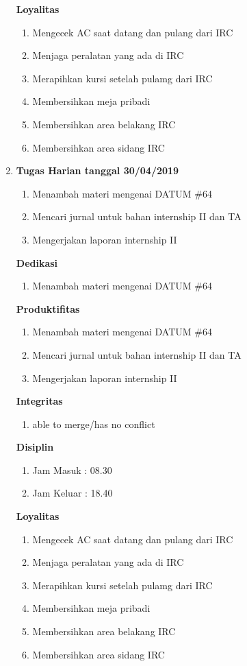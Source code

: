 \begin{enumerate}
\textbf{Loyalitas}
\begin{enumerate}
\item Mengecek AC saat datang dan pulang dari IRC
\item Menjaga peralatan yang ada di IRC
\item Merapihkan kursi setelah pulamg dari IRC
\item Membersihkan meja pribadi
\item Membersihkan area belakang IRC
\item Membersihkan area sidang IRC
\end{enumerate}

\item \textbf{Tugas Harian tanggal 30/04/2019}
\begin{enumerate}
\item Menambah materi mengenai DATUM \#64
\item Mencari jurnal untuk bahan internship II dan TA
\item Mengerjakan laporan internship II
\end{enumerate}

\textbf{Dedikasi}
\begin{enumerate}
\item Menambah materi mengenai DATUM \#64
\end{enumerate}

\textbf{Produktifitas}
\begin{enumerate}
\item Menambah materi mengenai DATUM \#64
\item Mencari jurnal untuk bahan internship II dan TA
\item Mengerjakan laporan internship II
\end{enumerate}

\textbf{Integritas}
\begin{enumerate}
\item able to merge/has no conflict
\end{enumerate}

\textbf{Disiplin}
\begin{enumerate}
\item Jam Masuk : 08.30
\item Jam Keluar : 18.40
\end{enumerate}

\textbf{Loyalitas}
\begin{enumerate}
\item Mengecek AC saat datang dan pulang dari IRC
\item Menjaga peralatan yang ada di IRC
\item Merapihkan kursi setelah pulamg dari IRC
\item Membersihkan meja pribadi
\item Membersihkan area belakang IRC
\item Membersihkan area sidang IRC
\end{enumerate}



\end{enumerate}
